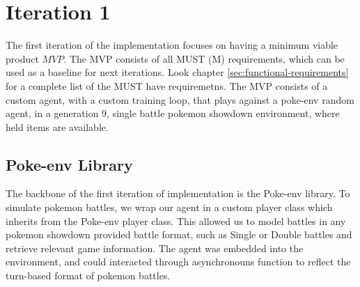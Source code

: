 \section{Iteration 1}
\label{sec:Iteration-1-Agent-Environment}

The first iteration of the implementation focuses on having a minimum viable product \(MVP\). The MVP
consists of all MUST (M) requirements, which can be used as a baseline for next iterations.
Look chapter \ref{sec:functional-requirements} for a complete list of the MUST have requiremetns.
The MVP consists of a custom agent, with a custom training loop, that plays against a poke-env random agent,
in a generation 9, single battle pokemon showdown environment, where held items are available. 

\subsection{Poke-env Library}
The backbone of the first iteration of implementation is the Poke-env library. 
To simulate pokemon battles, we wrap our agent in a custom player class which inherits from the
Poke-env player class. This allowed us to model battles in any pokemon showdown 
provided battle format, such as Single or Double battles and retrieve relevant game information.
The agent was embedded into the environment, and could interacted through asynchronouns function
to reflect the turn-based format of pokemon battles.


